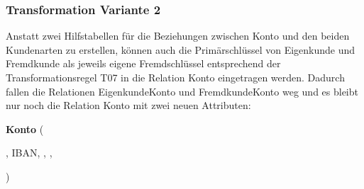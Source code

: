 \subsubsection{Transformation Variante 2}
Anstatt zwei Hilfstabellen für die Beziehungen zwischen Konto und den beiden Kundenarten zu erstellen, können auch die Primärschlüssel von Eigenkunde und Fremdkunde als jeweils eigene Fremdschlüssel entsprechend der Transformationsregel T07 in die Relation Konto eingetragen werden. Dadurch fallen die Relationen EigenkundeKonto und FremdkundeKonto weg und es bleibt nur noch die Relation Konto mit zwei neuen Attributen:

\textbf{Konto} (\begin{small}, IBAN, , , \end{small})
\clearpage

